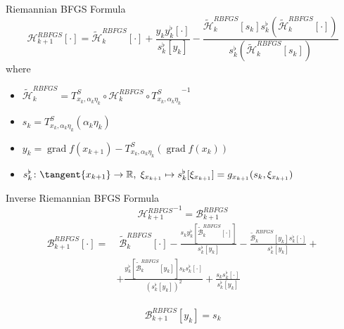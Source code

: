 \documentclass[9pt]{beamer}
\begin{document}
\begin{frame}{Riemannian BFGS Formula}
    \begin{equation*}
        \mathcal{H}^{RBFGS}_{k+1} [\cdot] = \widetilde{\mathcal{H}}^{RBFGS}_k [\cdot] + \frac{y_k y^{\flat}_k[\cdot]}{s^{\flat}_k [y_k]} - \frac{\widetilde{\mathcal{H}}^{RBFGS}_k [s_k] s^{\flat}_k (\widetilde{\mathcal{H}}^{RBFGS}_k [\cdot])}{s^{\flat}_k (\widetilde{\mathcal{H}}^{RBFGS}_k [s_k])}
    \end{equation*}
    where 
    \begin{itemize}
        \item $\widetilde{\mathcal{H}}^{RBFGS}_k = T^{S}_{x_k, \alpha_k \eta_k} \circ \mathcal{H}^{RBFGS}_k \circ {T^{S}_{x_k, \alpha_k \eta_k}}^{-1}$
        \item $s_k = T^{S}_{x_k, \alpha_k \eta_k}(\alpha_k \eta_k)$
        \item $y_k = \operatorname{grad} f(x_{k+1}) - T^{S}_{x_k, \alpha_k \eta_k}(\operatorname{grad} f(x_k))$
        \item $s^{\flat}_k \colon \tangent{x_{k+1}} \to \mathbb{R}, \;  \xi_{x_{k+1}} \mapsto s^{\flat}_k[\xi_{x_{k+1}}] = g_{x_{k+1}} (s_k, \xi_{x_{k+1}})$
    \end{itemize}
\end{frame}

\begin{frame}{Inverse Riemannian BFGS Formula}
    \begin{equation*}
        {\mathcal{H}^{RBFGS}_{k+1}}^{-1} = \mathcal{B}^{RBFGS}_{k+1} 
    \end{equation*}
    \begin{equation*}
        \begin{split}
            \mathcal{B}^{RBFGS}_{k+1} [\cdot] = & \; \widetilde{\mathcal{B}}^{RBFGS}_k [\cdot] -  \frac{s_k y^{\flat}_k[\widetilde{\mathcal{B}}^{RBFGS}_k [\cdot]]}{s^{\flat}_k [y_k]} - \frac{\widetilde{\mathcal{B}}^{RBFGS}_k [y_k]  s^{\flat}_k [\cdot]}{s^{\flat}_k [y_k]} + \\ & + \frac{y^{\flat}_k[\widetilde{\mathcal{B}}^{RBFGS}_k [y_k]] s_k s^{\flat}_k [\cdot]}{(s^{\flat}_k [y_k])^2} + \frac{s_k s^{\flat}_k [\cdot]}{s^{\flat}_k [y_k]}
        \end{split}
    \end{equation*} \\[0.3\baselineskip]
    \begin{equation*}
        \mathcal{B}^{RBFGS}_{k+1} [y_k] = s_k
    \end{equation*}
\end{frame}
\end{document}

